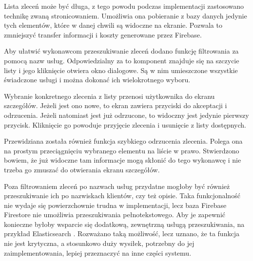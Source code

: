 Lista zleceń może być długa, z tego powodu podczas implementacji zastosowano technikę zwaną stronicowaniem. Umożliwia ona pobieranie z bazy danych jedynie tych elementów, które w danej chwili są widoczne na ekranie. Pozwala to zmniejszyć transfer informacji i koszty generowane przez Firebase. 

Aby ułatwić wykonawcom przeszukiwanie zleceń dodano funkcję filtrowania za pomocą nazw usług. Odpowiedzialny za to komponent znajduje się na szczycie listy i jego kliknięcie otwiera okno dialogowe. Są w nim umieszczone wszystkie świadczone usługi i można dokonać ich wielokrotnego wyboru.

Wybranie konkretnego zlecenia z listy przenosi użytkownika do ekranu szczegółów. Jeżeli jest ono nowe, to ekran zawiera przyciski do akceptacji i odrzucenia. Jeżeli natomiast jest już odrzucone, to widoczny jest jedynie pierwszy przycisk. Kliknięcie go powoduje przyjęcie zlecenia i usunięcie z listy dostępnych. 

Przewidziana została również funkcja szybkiego odrzucenia zlecenia. Polega ona na prostym przeciągnięciu wybranego elementu na liście w prawo. Stwierdzono bowiem, że już widoczne tam informacje mogą skłonić do tego wykonawcę i nie trzeba go zmuszać do otwierania ekranu szczegółów.

Poza filtrowaniem zleceń po nazwach usług przydatne mogłoby być również przeszukiwanie ich po nazwiskach klientów, czy też opisie. Taka funkcjonalność nie wydaje się powierzchownie trudna w implementacji, lecz baza Firebase Firestore nie umożliwia przeszukiwania pełnotekstowego. Aby je zapewnić konieczne byłoby wsparcie się dodatkową, zewnętrzną usługą przeszukiwania, na przykład Elasticsearch \cite{elasticsearch}. Rozważano taką możliwość, lecz uznano, że ta funkcja nie jest krytyczna, a stosunkowo duży wysiłek, potrzebny do jej zaimplementowania, lepiej przeznaczyć na inne części systemu.